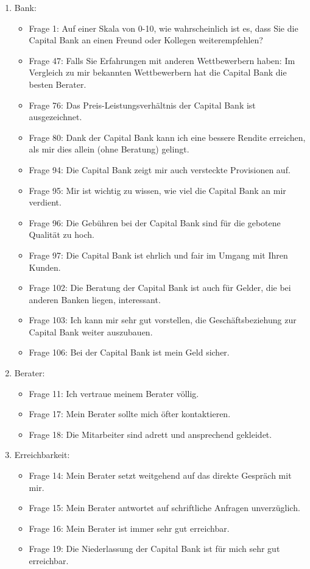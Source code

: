 \documentclass{article}\usepackage[]{graphicx}\usepackage[]{color}
\begin{document}
\begin{enumerate}
    \item Bank:
    \begin{itemize}
    \item Frage 1:
    Auf einer Skala von 0-10, wie wahrscheinlich ist es, dass Sie die Capital Bank an einen Freund oder Kollegen weiterempfehlen?
    \item Frage 47:
    Falls Sie Erfahrungen mit anderen Wettbewerbern haben: Im Vergleich zu mir bekannten Wettbewerbern hat die Capital Bank die besten Berater.
    \item Frage 76:
    Das Preis-Leistungsverhältnis der Capital Bank ist ausgezeichnet.
    \item Frage 80:
    Dank der Capital Bank kann ich eine bessere Rendite erreichen, als mir dies allein (ohne Beratung) gelingt.
    \item Frage 94:
    Die Capital Bank zeigt mir auch versteckte Provisionen auf.
    \item Frage 95:
    Mir ist wichtig zu wissen, wie viel die Capital Bank an mir verdient.
    \item Frage 96:
    Die Gebühren bei der Capital Bank sind für die gebotene Qualität zu hoch.
    \item Frage 97:
    Die Capital Bank ist ehrlich und fair im Umgang mit Ihren Kunden.
    \item Frage 102:
    Die Beratung der Capital Bank ist auch für Gelder, die bei anderen Banken liegen, interessant.
    \item Frage 103:
    Ich kann mir sehr gut vorstellen, die Geschäftsbeziehung zur Capital Bank weiter auszubauen.
    \item Frage 106:
    Bei der Capital Bank ist mein Geld sicher.
    \end{itemize}
    

    \item Berater:    
    \begin{itemize}
    \item Frage 11:
    Ich vertraue meinem Berater völlig.
    \item Frage 17:
    Mein Berater sollte mich öfter kontaktieren.
    \item Frage 18:
    Die Mitarbeiter sind adrett und ansprechend gekleidet.
    \end{itemize}
    

  
    


    \item  Erreichbarkeit:   
    \begin{itemize}
    \item Frage 14:
    Mein Berater setzt weitgehend auf das direkte Gespräch mit mir.
    \item Frage 15:
    Mein Berater antwortet auf schriftliche Anfragen unverzüglich.
    \item Frage 16:
    Mein Berater ist immer sehr gut erreichbar.
    \item Frage 19:
    Die Niederlassung der Capital Bank ist für mich sehr gut erreichbar.
    \end{itemize}
    

\end{enumerate}
\end{document}
